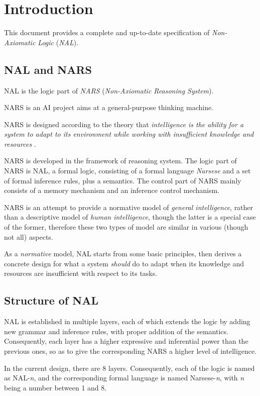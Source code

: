 
\chapter{Introduction}

This document provides a complete and up-to-date specification of \emph{Non-Axiomatic Logic} (\emph{NAL}).

\section{NAL and NARS}

NAL is the logic part of \emph{NARS} (\emph{Non-Axiomatic Reasoning System}).

NARS is an AI project aims at a general-purpose thinking machine.

NARS is designed according to the theory that \emph{intelligence is the ability for a system to adapt to its environment while working with insufficient knowledge and resources} \cite{wp:phd,wp:book1}.

NARS is developed in the framework of reasoning system. The logic part of NARS is NAL, a formal logic, consisting of a formal language \emph{Narsese} and a set of formal inference rules, plus a semantics. The control part of NARS mainly consists of a memory mechanism and an inference control mechanism. 

NARS is an attempt to provide a normative model of \emph{general intelligence}, rather than a descriptive model of \emph{human intelligence}, though the latter is a special case of the former, therefore these two types of model are similar in various (though not all) aspects.

As a \emph{normative} model, NAL starts from some basic principles, then derives a concrete design for what a system \emph{should} do to adapt when its knowledge and resources are insufficient with respect to its tasks.

\section{Structure of NAL}

NAL is established in multiple layers, each of which extends the logic by adding new grammar and inference rules, with proper addition of the semantics. Consequently, each layer has a higher expressive and inferential power than the previous ones, so as to give the corresponding NARS a higher level of intelligence.

In the current design, there are 8 layers. Consequently, each of the logic is named as NAL-\emph{n}, and the corresponding formal language is named Narsese-\emph{n}, with \emph{n} being a number between 1 and 8.

